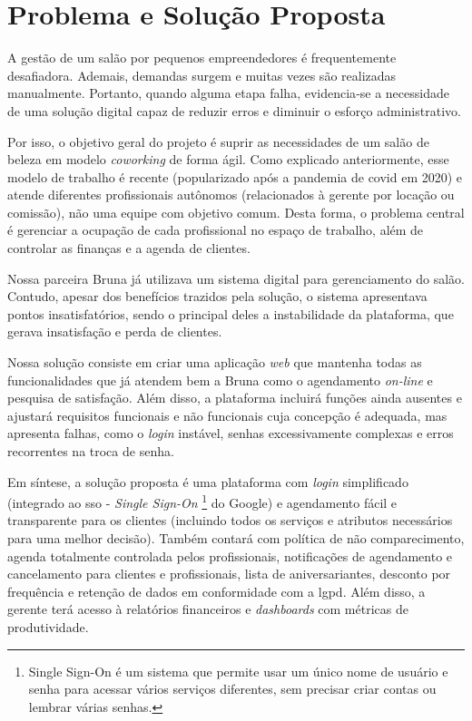 \section{Problema e Solução Proposta}

A gestão de um salão por pequenos empreendedores é frequentemente desafiadora. Ademais, demandas surgem e muitas vezes são realizadas manualmente. Portanto, quando alguma etapa falha, evidencia‐se a necessidade de uma solução digital capaz de reduzir erros e diminuir o esforço administrativo.

Por isso, o objetivo geral do projeto é suprir as necessidades de um salão de beleza em modelo \emph{coworking} de forma ágil. Como explicado anteriormente, esse modelo de trabalho é recente (popularizado após a pandemia de \gls{covid} em 2020) e atende diferentes profissionais autônomos (relacionados à gerente por locação ou comissão), não uma equipe com objetivo comum. Desta forma, o problema central é gerenciar a ocupação de cada profissional no espaço de trabalho, além de controlar as finanças e a agenda de clientes.

Nossa parceira Bruna já utilizava um sistema digital para gerenciamento do salão. Contudo, apesar dos benefícios trazidos pela solução, o sistema apresentava pontos insatisfatórios, sendo o principal deles a instabilidade da plataforma, que gerava insatisfação e perda de clientes.

Nossa solução consiste em criar uma aplicação \emph{web} que mantenha todas as funcionalidades que já atendem bem a Bruna como o agendamento \emph{on-line} e pesquisa de satisfação. Além disso, a plataforma incluirá funções ainda ausentes e ajustará requisitos funcionais e não funcionais cuja concepção é adequada, mas apresenta falhas, como o \emph{login} instável, senhas excessivamente complexas e erros recorrentes na troca de senha.

Em síntese, a solução proposta é uma plataforma com \emph{login} simplificado (integrado ao \gls{sso} - \emph{Single Sign-On} \footnote{Single Sign-On é um sistema que permite usar um único nome de usuário e senha para acessar vários serviços diferentes, sem precisar criar contas ou lembrar várias senhas.} do Google) e agendamento fácil e transparente para os clientes (incluindo todos os serviços e atributos necessários para uma melhor decisão). Também contará com política de não comparecimento, agenda totalmente controlada pelos profissionais, notificações de agendamento e cancelamento para clientes e profissionais, lista de aniversariantes, desconto por frequência e retenção de dados em conformidade com a \gls{lgpd}. Além disso, a gerente terá acesso à relatórios financeiros e \emph{dashboards} com métricas de produtividade.

